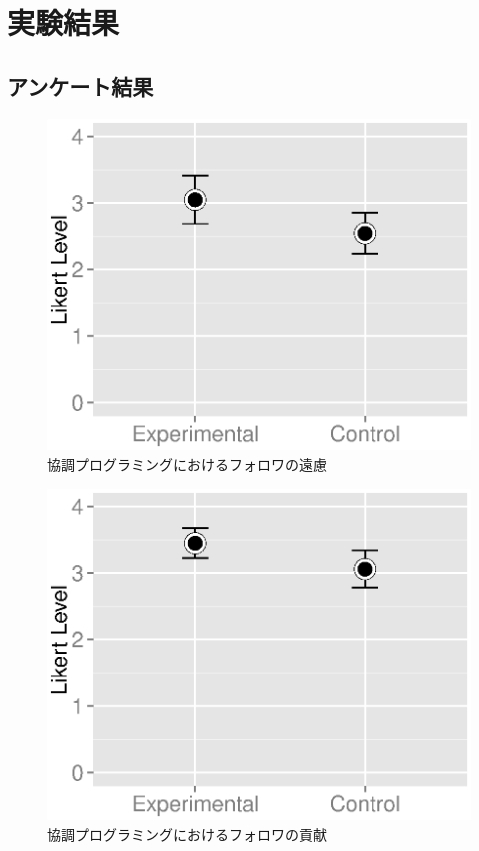\chapter{実験結果}\label{RS}


\section{アンケート結果}


\begin{figure}[tb]
	\begin{center}
		\includegraphics[scale=0.5]{img/diffidence.eps}
		\caption{協調プログラミングにおけるフォロワの遠慮}
		\label{fig:Diffidence}
	\end{center}
\end{figure}


\begin{figure}[tb]
	\begin{center}
		\includegraphics[scale=0.5]{img/contribution.eps}
		\caption{協調プログラミングにおけるフォロワの貢献}
		\label{fig:Contribution}
	\end{center}
\end{figure}


